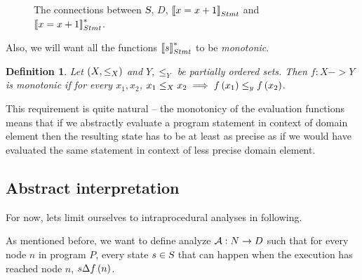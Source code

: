 \documentclass[..thesis.tex]{subfiles}
\newtheorem{defin}{Definition}[section]
\begin{document}
\begin{figure}[H]
  \begin{centering}
  \end{centering}
  \caption{The connections between $\textsl{S}$, $D$, $\left\llbracket x = x +1  \right\rrbracket_{Stmt}$ and $\left\llbracket x = x + 1 \right\rrbracket_{Stmt}^{*}$.}
\end{figure}

Also, we will want all the functions $\left\llbracket s \right\rrbracket_{Stmt}^{*}$ to be \textit{monotonic}.

\begin{defin}
Let $\left( X, \leq_X \right)$ and $Y, \leq_Y$ be partially ordered sets. Then $f : X -> Y$ is \textit{monotonic} if for every $x_1, x_2$, $x_1 \leq_X x_2 \implies f \left( x_1 \right) \leq_y f \left( x_2 \right)$.   
\end{defin}

This requirement is quite natural -- the monotonicy of the evaluation functions means that if we abstractly evaluate a program statement in context of domain element then the resulting state has to be at least as precise as if we would have evaluated the same statement in context of less precise domain element.  


\subsection{Abstract interpretation}

For now, lets limit ourselves to intraprocedural analyses in following.
 
As mentioned before, we want to define analyze $\mathcal{A} : N \to D$ such that for every node $n$ in program $P$, every state $s \in \textsl{S}$ that can happen when the execution has reached node $n$, $s \Delta f \left( n \right)$.
  
\end{document}
